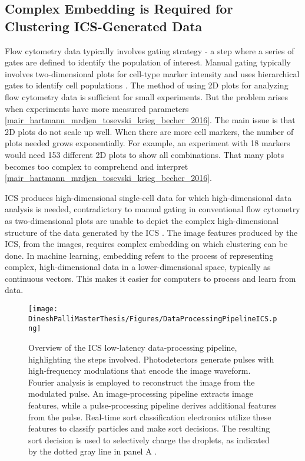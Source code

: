 \documentclass[12pt,a4paper]{article}
\begin{document}
\subsection{Complex Embedding is Required for Clustering ICS-Generated Data}
Flow cytometry data typically involves gating strategy - a step where a series of gates are defined to identify the population of interest. Manual gating typically involves two-dimensional plots for cell-type marker intensity and uses hierarchical gates to identify cell populations \cite{10.3389/fimmu.2021.787574}. The method of using 2D plots for analyzing flow cytometry data is sufficient for small experiments. But the problem arises when experiments have more measured parameters \ref{mair_hartmann_mrdjen_tosevski_krieg_becher_2016}. The main issue is that 2D plots do not scale up well. When there are more cell markers, the number of plots needed grows exponentially. For example, an experiment with 18 markers would need 153 different 2D plots to show all combinations. That many plots becomes too complex to comprehend and interpret \ref{mair_hartmann_mrdjen_tosevski_krieg_becher_2016}.

ICS produces high-dimensional single-cell data for which high-dimensional data analysis is needed, contradictory to manual gating in conventional flow cytometry as two-dimensional plots are unable to depict the complex high-dimensional structure of the data generated by the ICS \cite{doi:10.1126/science.abj3013}. The image features produced by the ICS, from the images, requires complex embedding on which clustering can be done. In machine learning, embedding refers to the process of representing complex, high-dimensional data in a lower-dimensional space, typically as continuous vectors. This makes it easier for computers to process and learn from data.

\begin{figure}
  \centering
  \texttt{[image: DineshPalliMasterThesis/Figures/DataProcessingPipelineICS.png]}
  \caption{Overview of the ICS low-latency data-processing pipeline, highlighting the steps involved. Photodetectors generate pulses with high-frequency modulations that encode the image waveform. Fourier analysis is employed to reconstruct the image from the modulated pulse. An image-processing pipeline extracts image features, while a pulse-processing pipeline derives additional features from the pulse. Real-time sort classification electronics utilize these features to classify particles and make sort decisions. The resulting sort decision is used to selectively charge the droplets, as indicated by the dotted gray line in panel A \cite{doi:10.1126/science.abj3013}.}
  \label{icsdataprocessing}
\end{figure}
\end{document}

